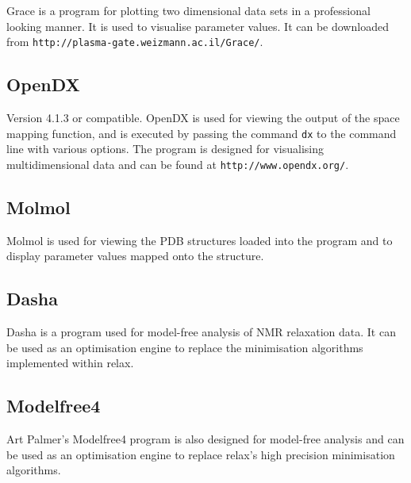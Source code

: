 Grace is a program for plotting two dimensional data sets in a professional looking manner.  It is used to visualise parameter values.  It can be downloaded from \texttt{http://plasma-gate.weizmann.ac.il/Grace/}.


\subsection{OpenDX}

Version 4.1.3 or compatible.  OpenDX is used for viewing the output of the space mapping function, and is executed by passing the command \texttt{dx} to the command line with various options.  The program is designed for visualising multidimensional data and can be found at \texttt{http://www.opendx.org/}.


\subsection{Molmol}

Molmol is used for viewing the PDB structures loaded into the program and to display parameter values mapped onto the structure.


\subsection{Dasha}

Dasha is a program used for model-free analysis of NMR relaxation data.  It can be used as an optimisation engine to replace the minimisation algorithms implemented within relax.


\subsection{Modelfree4}

Art Palmer's Modelfree4 program is also designed for model-free analysis and can be used as an optimisation engine to replace relax's high precision minimisation algorithms.

